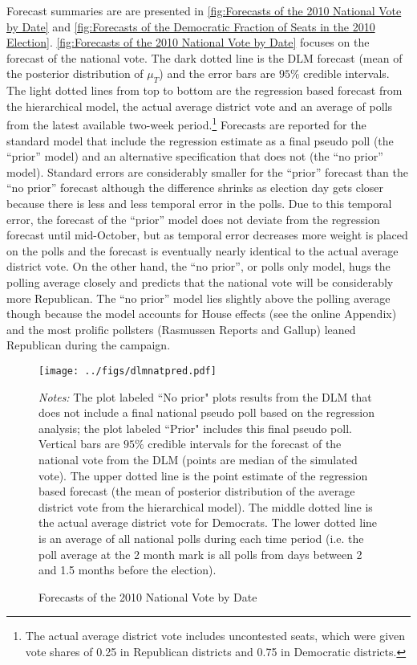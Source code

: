 \documentclass[12pt,final,fleqn]{article}
\theoremstyle{plain}
\begin{document}
Forecast summaries are are presented in \autoref{fig:Forecasts of the 2010 National Vote by Date} and \autoref{fig:Forecasts of the Democratic Fraction of Seats in the 2010 Election}. \autoref{fig:Forecasts of the 2010 National Vote by Date} focuses on the forecast of the national vote. The dark dotted line is the DLM forecast (mean of the posterior distribution of $\mu_T$) and the error bars are $95\%$ credible intervals. The light dotted lines from top to bottom are the regression based forecast from the hierarchical model, the actual average district vote and an average of polls from the latest available two-week period.\footnote{The actual average district vote includes uncontested seats, which were given vote shares of 0.25 in Republican districts and 0.75 in Democratic districts.} Forecasts are reported for the standard model that include the regression estimate as a final pseudo poll (the ``prior'' model) and an alternative specification that does not (the ``no prior'' model). Standard errors are considerably smaller for the ``prior'' forecast than the ``no prior'' forecast although the difference shrinks as election day gets closer because there is less and less temporal error in the polls. Due to this temporal error, the forecast of the ``prior'' model does not deviate from the regression forecast until mid-October, but as temporal error decreases more weight is placed on the polls and the forecast is eventually nearly identical to the actual average district vote. On the other hand, the ``no prior'', or polls only model, hugs the polling average closely and predicts that the national vote will be considerably more Republican. The ``no prior'' model lies slightly above the polling average though because the model accounts for House effects (see the online Appendix) and the most prolific pollsters (Rasmussen Reports and Gallup) leaned Republican during the campaign. 

\begin{figure}[!htb]
\centering
\texttt{[image: ../figs/dlmnatpred.pdf]}
\vspace{.5cm}
\caption{Forecasts of the 2010 National Vote by Date}
\label{fig:Forecasts of the 2010 National Vote by Date}
\begin{minipage}{\linewidth}
\footnotesize
\emph{Notes:} The plot labeled ``No prior" plots results from the DLM that does not include a final national pseudo poll based on the regression analysis; the plot labeled ``Prior" includes this final pseudo poll. Vertical bars are $95\%$ credible intervals for the forecast of the national vote from the DLM (points are median of the simulated vote). The upper dotted line is the point estimate of the regression based forecast (the mean of posterior distribution of the average district vote from the hierarchical model). The middle dotted line is the actual average district vote for Democrats. The lower dotted line is an average of all national polls during each time period (i.e. the poll average at the 2 month mark is all polls from days between 2 and 1.5 months before the election).
\end{minipage}
\end{figure}
\end{document}
